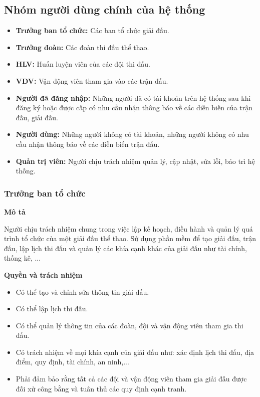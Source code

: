 \subsection{Nhóm người dùng chính của hệ thống}
\setcounter{subsection}{4}
\setcounter{figure}{0}

\begin{itemize}[leftmargin=1.5cm, label={\textbf{--}}]
  \item \textbf{Trưởng ban tổ chức:} Các ban tổ chức giải đấu.
  \item \textbf{Trưởng đoàn:} Các đoàn thi đấu thể thao.
  \item \textbf{HLV:} Huấn luyện viên của các đội thi đấu.
  \item \textbf{VDV:} Vận động viên tham gia vào các trận đấu.
  \item \textbf{Người đã đăng nhập:} Những người đã có tài khoản trên hệ thống sau khi đăng ký hoặc được cấp có nhu cầu nhận thông báo về các diễn biến của trận đấu, giải đấu.
  \item \textbf{Người dùng:} Những người không có tài khoản, những người không có nhu cầu nhận thông báo về các diễn biến trận đấu.
  \item \textbf{Quản trị viên:} Người chịu trách nhiệm quản lý, cập nhật, sửa lỗi, bảo trì hệ thống.
\end{itemize}

\subsubsection{Trưởng ban tổ chức}
\noindent
\textbf{Mô tả}

Người chịu trách nhiệm chung trong việc lập kế hoạch,
điều hành và quản lý quá trình tổ chức của một giải đấu thể thao.
Sử dụng phần mềm để tạo giải đấu, trận đấu,
lập lịch thi đấu và quản lý các khía cạnh khác của giải đấu như tài chính,
thống kê, ...

\noindent
\textbf{Quyền và trách nhiệm}
\begin{itemize}[leftmargin=1.5cm, label={\textbf{--}}]
  \item Có thể tạo và chỉnh sửa thông tin giải đấu.
  \item Có thể lập lịch thi đấu.
  \item Có thể quản lý thông tin của các đoàn, đội và vận động viên tham gia thi đấu.
  \item Có trách nhiệm về mọi khía cạnh của giải đấu như: xác định lịch thi đấu, địa điểm, quy định, tài chính, an ninh,...
  \item Phải đảm bảo rằng tất cả các đội và vận động viên tham gia giải đấu được đối xử công bằng và tuân thủ các quy định cạnh tranh.
\end{itemize}

